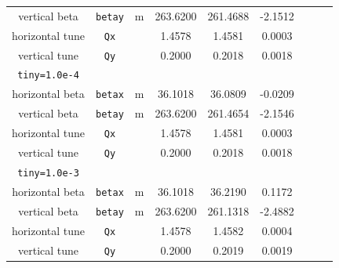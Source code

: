 \documentclass[12pt]{article}
\begin{document}
\begin{table}[h]
\begin{tabular}{|c|c|c|c|c|c|c|c|c|}
vertical beta     & {\tt betay}       &  m    &  263.6200    &   261.4688     & -2.1512 \\
horizontal tune  &  {\tt Qx}         &       &   1.4578      &     1.4581     &  0.0003 \\
vertical tune     &  {\tt Qy}         &       &   0.2000     &     0.2018     &  0.0018 \\ \hline           
 {\tt tiny=1.0e-4} &                  &       &              &                &     \\ \hline 
horizontal beta  & {\tt betax}       &  m    &  36.1018      &    36.0809     & -0.0209  \\ 
vertical beta     & {\tt betay}       &  m    &  263.6200    &   261.4654     & -2.1546 \\ 
horizontal tune  &  {\tt Qx}         &       &   1.4578      &     1.4581     &  0.0003 \\
vertical tune     &  {\tt Qy}         &       &   0.2000     &     0.2018     &  0.0018 \\ \hline           
 {\tt tiny=1.0e-3} &                  &       &              &   &     \\ \hline 
horizontal beta  & {\tt betax}       &  m    &  36.1018      &    36.2190     &   0.1172 \\ 
vertical beta     & {\tt betay}       &  m    &  263.6200    &   261.1318     &  -2.4882 \\ 
horizontal tune  &  {\tt Qx}         &       &   1.4578      &    1.4582      &    0.0004 \\
vertical tune     &  {\tt Qy}         &       &   0.2000     &    0.2019      &    0.0019 \\ \hline
\end{tabular}
\end{table}
%
\end{document}
